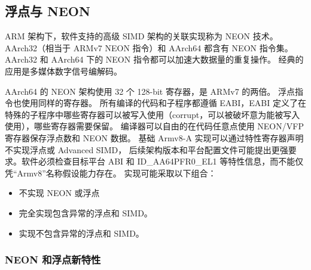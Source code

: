 \subsection{浮点与 NEON} \label{sec:floating-neon}

ARM 架构下，软件支持的高级 SIMD 架构的关联实现称为 NEON 技术。
AArch32（相当于 ARMv7 NEON 指令）和 AArch64 都含有 NEON 指令集。
AArch32 和 AArch64 下的 NEON 指令都可以加速大数据量的重复操作。
经典的应用是多媒体数字信号编解码。

AArch64 的 NEON 架构使用 32 个 128-bit 寄存器，是 ARMv7 的两倍。
浮点指令也使用同样的寄存器。
所有编译的代码和子程序都遵循 EABI，EABI 定义了在特殊的子程序中哪些寄存器可以被写入使用（corrupt，可以被破坏意为能被写入使用），哪些寄存器需要保留。
编译器可以自由的在代码任意点使用 NEON/VFP 寄存器保存浮点数和 NEON 数据。
基础 Armv8-A 实现可以通过特性寄存器声明不实现浮点或 Advanced SIMD，
后续架构版本和平台配置文件可能提出更强要求。软件必须检查目标平台 ABI 和
ID\_AA64PFR0\_EL1 等特性信息，而不能仅凭“Armv8”名称假设能力存在。
实现可能采取以下组合：
\begin{itemize}
  \item 不实现 NEON 或浮点
  \item 完全实现包含异常的浮点和 SIMD。
  \item 实现不包含异常的浮点和 SIMD。
\end{itemize}

\subsubsection{NEON 和浮点新特性}

